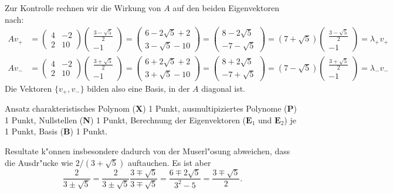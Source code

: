 \begin{loesung}
Zur Kontrolle rechnen wir die Wirkung von $A$ auf den beiden Eigenvektoren
nach:
\begin{align*}
Av_+
&=
\begin{pmatrix}4&-2\\2&10\end{pmatrix}
\begin{pmatrix}
\frac{3-\sqrt{5}}2\\-1
\end{pmatrix}
=
\begin{pmatrix}
6-2\sqrt{5}+2\\
3-\sqrt{5}-10
\end{pmatrix}
=
\begin{pmatrix}
8-2\sqrt{5}\\
-7-\sqrt{5}
\end{pmatrix}
=
(7+\sqrt{5})
\begin{pmatrix}
\frac{3-\sqrt{5}}2\\
-1
\end{pmatrix}
=
\lambda_+v_+
\\
Av_-
&=
\begin{pmatrix}4&-2\\2&10\end{pmatrix}
\begin{pmatrix}
\frac{3+\sqrt{5}}2\\-1
\end{pmatrix}
=
\begin{pmatrix}
6+2\sqrt{5}+2\\
3+\sqrt{5}-10
\end{pmatrix}
=
\begin{pmatrix}
8+2\sqrt{5}\\
-7+\sqrt{5}
\end{pmatrix}
=
(7-\sqrt{5})
\begin{pmatrix}
\frac{3+\sqrt{5}}2\\
-1
\end{pmatrix}
=
\lambda_-v_-
\end{align*}
Die Vektoren $\{v_+,v_-\}$ bilden also eine Basis, in der $A$ diagonal ist.
\end{loesung}

\begin{bewertung}
Ansatz charakteristisches Polynom ({\bf X}) 1 Punkt,
ausmultipiziertes Polynome ({\bf P}) 1 Punkt,
Nullstellen ({\bf N}) 1 Punkt,
Berechnung der Eigenvektoren ($\textbf{E}_1$ und $\textbf{E}_2$) je 1 Punkt,
Basis ({\bf B}) 1 Punkt.
\end{bewertung}

\begin{diskussion}
Resultate k"onnen insbesondere dadurch von der Muserl"osung abweichen,
dass die Ausdr"ucke wie $2/(3+\sqrt{5})$ auftauchen. Es ist aber
\[
\frac{2}{3\pm \sqrt{5}}
=
\frac{2}{3\pm \sqrt{5}}\frac{3\mp\sqrt{5}}{3\mp\sqrt{5}}
=
\frac{6\mp2\sqrt{5}}{3^2-5}
=
\frac{3\mp\sqrt{5}}2.
\]
\end{diskussion}

